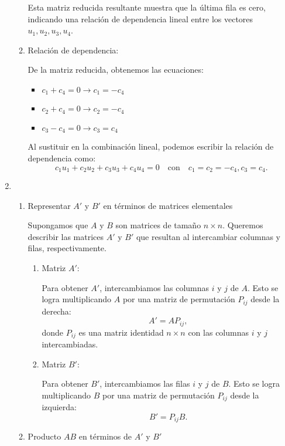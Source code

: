 \begin{enumerate}[label=\color{red}\textbf{\arabic*)}]
\begin{enumerate}[label=\arabic*)]
Esta matriz reducida resultante muestra que la última fila es cero, indicando una relación de dependencia lineal entre los vectores $u_1,u_2,u_3,u_4$.
\item Relación de dependencia:

    De la matriz reducida, obtenemos las ecuaciones: 
    \begin{itemize}[label=\textbullet]
        \item $c_1+c_4=0\longrightarrow c_1=-c_4$
        \item $c_2+c_4=0\longrightarrow c_2=-c_4$
        \item $c_3-c_4=0\longrightarrow c_3=c_4$
    \end{itemize}
    Al sustituir en la combinación lineal, podemos escribir la relación de dependencia como: \[
    c_1u_1+c_2u_2+c_3u_3+c_4u_4=0\quad \text{con}\quad c_1=c_2=-c_4,c_3=c_4.
    \] 
        \end{enumerate}
    \item {}

        \begin{enumerate}[label=Paso \arabic*:]
            \item Representar $A'$ y  $B'$ en términos de matrices elementales

                Supongamos que  $A$ y  $B$ son matrices de tamaño  $n\times n$. Queremos describir las matrices $A'$ y  $B'$ que resultan al intercambiar columnas y filas, respectivamente.
                 \begin{enumerate}[label=1.\arabic*)]
                    \item Matriz $A'$:

                        Para obtener  $A'$, intercambiamos las columnas  $i$ y $j$ de $A$. Esto se logra multiplicando $A$ por una matriz de permutación  $P_{ij}$  desde la derecha: \[
                        A'=AP_{ij},
                        \] 
                        donde $P_{ij}$ es una matriz identidad $n\times n$ con las columnas $i$ y $j$ intercambiadas.
                    \item Matriz $B'$:

                        Para obtener  $B'$, intercambiamos las filas  $i$ y $j$ de $B$. Esto se logra multiplicando  $B$ por una matriz de permutación  $P_{ij}$  desde la izquierda: \[
                        B'=P_{ij}B.
                        \] 
                \end{enumerate}
            \item Producto $AB$ en términos de  $A'$ y $B'$  


\end{enumerate}
\end{enumerate}

